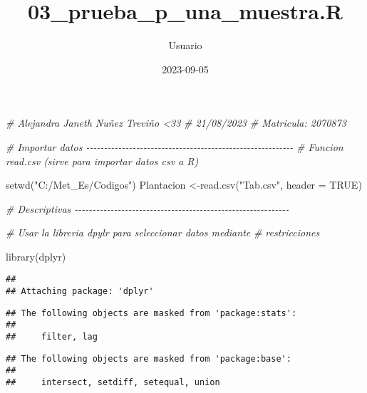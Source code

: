 \documentclass[
]{article}
\title{03\_prueba\_p\_una\_muestra.R}
\author{Usuario}
\date{2023-09-05}
\newenvironment{Shaded}{\begin{snugshade}}{\end{snugshade}}
\newcommand{\AttributeTok}[1]{\textcolor[rgb]{0.77,0.63,0.00}{#1}}
\newcommand{\CommentTok}[1]{\textcolor[rgb]{0.56,0.35,0.01}{\textit{#1}}}
\newcommand{\ConstantTok}[1]{\textcolor[rgb]{0.00,0.00,0.00}{#1}}
\newcommand{\FunctionTok}[1]{\textcolor[rgb]{0.00,0.00,0.00}{#1}}
\newcommand{\NormalTok}[1]{#1}
\newcommand{\OtherTok}[1]{\textcolor[rgb]{0.56,0.35,0.01}{#1}}
\newcommand{\SpecialCharTok}[1]{\textcolor[rgb]{0.00,0.00,0.00}{#1}}
\newcommand{\StringTok}[1]{\textcolor[rgb]{0.31,0.60,0.02}{#1}}
\begin{document}
\maketitle

\begin{Shaded}
\begin{Highlighting}[]
\CommentTok{\# Alejandra Janeth Nuñez Treviño \textless{}33}
\CommentTok{\# 21/08/2023}
\CommentTok{\# Matricula: 2070873}

\CommentTok{\# Importar datos {-}{-}{-}{-}{-}{-}{-}{-}{-}{-}{-}{-}{-}{-}{-}{-}{-}{-}{-}{-}{-}{-}{-}{-}{-}{-}{-}{-}{-}{-}{-}{-}{-}{-}{-}{-}{-}{-}{-}{-}{-}{-}{-}{-}{-}{-}{-}{-}{-}{-}{-}{-}{-}{-}{-}{-}{-}{-}}
\CommentTok{\# Funcion read.csv (sirve para importar datos csv a R)}

\FunctionTok{setwd}\NormalTok{(}\StringTok{"C:/Met\_Es/Codigos"}\NormalTok{)}
\NormalTok{Plantacion }\OtherTok{\textless{}{-}}\FunctionTok{read.csv}\NormalTok{(}\StringTok{"Tab.csv"}\NormalTok{, }\AttributeTok{header =} \ConstantTok{TRUE}\NormalTok{)}

\CommentTok{\# Descriptivas {-}{-}{-}{-}{-}{-}{-}{-}{-}{-}{-}{-}{-}{-}{-}{-}{-}{-}{-}{-}{-}{-}{-}{-}{-}{-}{-}{-}{-}{-}{-}{-}{-}{-}{-}{-}{-}{-}{-}{-}{-}{-}{-}{-}{-}{-}{-}{-}{-}{-}{-}{-}{-}{-}{-}{-}{-}{-}{-}{-}}

\CommentTok{\# Usar la libreria dpylr para seleccionar datos mediante }
\CommentTok{\# restricciones }


\FunctionTok{library}\NormalTok{(dplyr)}
\end{Highlighting}
\end{Shaded}

\begin{verbatim}
## 
## Attaching package: 'dplyr'
\end{verbatim}

\begin{verbatim}
## The following objects are masked from 'package:stats':
## 
##     filter, lag
\end{verbatim}

\begin{verbatim}
## The following objects are masked from 'package:base':
## 
##     intersect, setdiff, setequal, union
\end{verbatim}

\begin{Shaded}
\end{Shaded}
\end{document}
